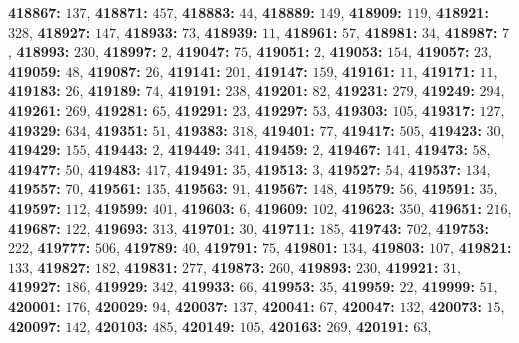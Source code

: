 \textsf{\bfseries 418867:} $137$, \textsf{\bfseries 418871:} $457$, \textsf{\bfseries 418883:} $44$, \textsf{\bfseries 418889:} $149$, \textsf{\bfseries 418909:} $119$, \textsf{\bfseries 418921:} $328$, \textsf{\bfseries 418927:} $147$, \textsf{\bfseries 418933:} $73$, \textsf{\bfseries 418939:} $11$, \textsf{\bfseries 418961:} $57$, \textsf{\bfseries 418981:} $34$, \textsf{\bfseries 418987:} $7$, \textsf{\bfseries 418993:} $230$, \textsf{\bfseries 418997:} $2$, \textsf{\bfseries 419047:} $75$, \textsf{\bfseries 419051:} $2$, \textsf{\bfseries 419053:} $154$, \textsf{\bfseries 419057:} $23$, \textsf{\bfseries 419059:} $48$, \textsf{\bfseries 419087:} $26$, \textsf{\bfseries 419141:} $201$, \textsf{\bfseries 419147:} $159$, \textsf{\bfseries 419161:} $11$, \textsf{\bfseries 419171:} $11$, \textsf{\bfseries 419183:} $26$, \textsf{\bfseries 419189:} $74$, \textsf{\bfseries 419191:} $238$, \textsf{\bfseries 419201:} $82$, \textsf{\bfseries 419231:} $279$, \textsf{\bfseries 419249:} $294$, \textsf{\bfseries 419261:} $269$, \textsf{\bfseries 419281:} $65$, \textsf{\bfseries 419291:} $23$, \textsf{\bfseries 419297:} $53$, \textsf{\bfseries 419303:} $105$, \textsf{\bfseries 419317:} $127$, \textsf{\bfseries 419329:} $634$, \textsf{\bfseries 419351:} $51$, \textsf{\bfseries 419383:} $318$, \textsf{\bfseries 419401:} $77$, \textsf{\bfseries 419417:} $505$, \textsf{\bfseries 419423:} $30$, \textsf{\bfseries 419429:} $155$, \textsf{\bfseries 419443:} $2$, \textsf{\bfseries 419449:} $341$, \textsf{\bfseries 419459:} $2$, \textsf{\bfseries 419467:} $141$, \textsf{\bfseries 419473:} $58$, \textsf{\bfseries 419477:} $50$, \textsf{\bfseries 419483:} $417$, \textsf{\bfseries 419491:} $35$, \textsf{\bfseries 419513:} $3$, \textsf{\bfseries 419527:} $54$, \textsf{\bfseries 419537:} $134$, \textsf{\bfseries 419557:} $70$, \textsf{\bfseries 419561:} $135$, \textsf{\bfseries 419563:} $91$, \textsf{\bfseries 419567:} $148$, \textsf{\bfseries 419579:} $56$, \textsf{\bfseries 419591:} $35$, \textsf{\bfseries 419597:} $112$, \textsf{\bfseries 419599:} $401$, \textsf{\bfseries 419603:} $6$, \textsf{\bfseries 419609:} $102$, \textsf{\bfseries 419623:} $350$, \textsf{\bfseries 419651:} $216$, \textsf{\bfseries 419687:} $122$, \textsf{\bfseries 419693:} $313$, \textsf{\bfseries 419701:} $30$, \textsf{\bfseries 419711:} $185$, \textsf{\bfseries 419743:} $702$, \textsf{\bfseries 419753:} $222$, \textsf{\bfseries 419777:} $506$, \textsf{\bfseries 419789:} $40$, \textsf{\bfseries 419791:} $75$, \textsf{\bfseries 419801:} $134$, \textsf{\bfseries 419803:} $107$, \textsf{\bfseries 419821:} $133$, \textsf{\bfseries 419827:} $182$, \textsf{\bfseries 419831:} $277$, \textsf{\bfseries 419873:} $260$, \textsf{\bfseries 419893:} $230$, \textsf{\bfseries 419921:} $31$, \textsf{\bfseries 419927:} $186$, \textsf{\bfseries 419929:} $342$, \textsf{\bfseries 419933:} $66$, \textsf{\bfseries 419953:} $35$, \textsf{\bfseries 419959:} $22$, \textsf{\bfseries 419999:} $51$, \textsf{\bfseries 420001:} $176$, \textsf{\bfseries 420029:} $94$, \textsf{\bfseries 420037:} $137$, \textsf{\bfseries 420041:} $67$, \textsf{\bfseries 420047:} $132$, \textsf{\bfseries 420073:} $15$, \textsf{\bfseries 420097:} $142$, \textsf{\bfseries 420103:} $485$, \textsf{\bfseries 420149:} $105$, \textsf{\bfseries 420163:} $269$, \textsf{\bfseries 420191:} $63$, 
